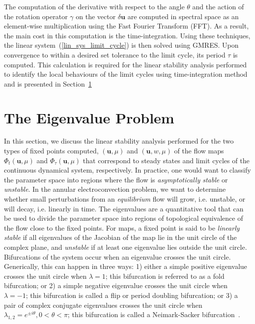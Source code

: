 The computation of the derivative with respect to the angle $\theta$ and the action of the rotation operator $\gamma$ on the vector $\delta\mathbf{u}$ are computed in spectral space as an element-wise multiplication using the Fast Fourier Transform (FFT).  As a result, the main cost in this computation is the time-integration. Using these techniques, the linear system~(\ref{lin_sys_limit_cycle}) is then solved using GMRES. Upon convergence to within a desired set tolerance to the limit cycle, its period $\tau$  is computed. This calculation is required for the linear stability analysis performed to identify the local behaviours of the limit cycles using time-integration method and is presented in Section~\ref{sec_lin_sta_ana}

\section{The Eigenvalue Problem}\label{sec_lin_sta_ana}
In this section, we discuss the linear stability analysis performed for the two types of fixed points computed, $(\mathbf{u},\mu)$ and $(\mathbf{u},w,\mu)$ of the flow maps $\Phi_{t}(\mathbf{u},\mu)$ and $\Phi_{\tau}(\mathbf{u},\mu)$  that correspond to steady states and limit cycles of the continuous dynamical system, respectively.
In practice, one would want to classify the parameter space into regions where the flow is \emph{asymptotically stable} or \emph{unstable}. In the annular electroconvection problem, we want to determine whether  small perturbations from an \emph{equilibrium} flow will grow, i.e. unstable, or will decay, i.e. linearly in time. The eigenvalues are a quantitative tool that can be used to divide the parameter space into regions of topological equivalence of the flow close to the fixed points. For maps, a fixed point is said to be \emph{linearly stable} if all eigenvalues of the Jacobian of the map lie in the unit circle of the complex plane, and \emph{unstable} if at least one eigenvalue lies outside the unit circle. Bifurcations of the system occur when an eigenvalue crosses the unit circle.
Generically, this can happen in three ways: 1) either a simple positive eigenvalue crosses the unit circle when $\lambda = 1$; this bifurcation is referred to as a fold bifurcation; or  2) a simple negative eigenvalue crosses the unit circle when $\lambda = -1$; this bifurcation is called a flip or period doubling bifurcation; or 3) a pair of complex conjugate eigenvalues crosses the unit circle when $\lambda_{1,2} = e^{\pm i\theta}, 0<\theta<\pi$; this bifurcation is called a Neimark-Sacker bifurcation~\cite{Kuznet}.


